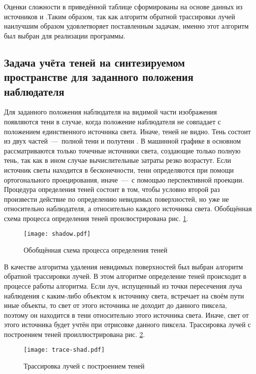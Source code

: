 Оценки сложности в приведённой таблице сформированы на основе данных из источников \cite{item12} и \cite{item13}.Таким образом, так как алгоритм обратной трассировки лучей наилучшим образом удовлетворяет поставленным задачам, именно этот алгоритм был выбран для реализации программы.

\subsection{Задача учёта теней на синтезируемом пространстве для заданного положения наблюдателя}
Для заданного положения наблюдателя на видимой части изображения появляются тени в случае, когда положение наблюдателя не совпадает с положением единственного источника света. Иначе, теней не видно. Тень состоит из двух частей~---~полной тени и полутени \cite{item12}. В машинной графике в основном рассматриваются только точечные источники света, создающие только полную тень, так как в ином случае вычислительные затраты резко возрастут. Если источник светы находится в бесконечности, тени определяются при помощи ортогонального проецирования, иначе~---~с помощью перспективной проекции. Процедура определения теней состоит в том, чтобы условно второй раз произвести действие по определению невидимых поверхностей, но уже не относительно наблюдателя, а относительно каждого источника света. Обобщённая схема процесса определения теней проилюстрирована рис. \ref{img:shadow}.

\begin{figure}[h!]
    \centering
    \texttt{[image: shadow.pdf]}
    \caption{Обобщённая схема процесса определения теней}
    \label{img:shadow}
\end{figure}

В качестве алгоритма удаления невидимых поверхностей был выбран алгоритм обратной трассировки лучей. В этом алгоритме определение теней происходит в процессе работы алгоритма. Если луч, испущенный из точки пересечения луча наблюдения с каким-либо объектом к источнику света, встречает на своём пути иные объекты, то свет от этого источника не доходит до данного пиксела, поэтому он находится в тени относительно этого источника света. Иначе, свет от этого источника будет учтён при отрисовке данного пиксела. Трассировка лучей с построением теней проиллюстрирована рис. \ref{img:trace-shad}.

\begin{figure}[h!]
    \centering
    \texttt{[image: trace-shad.pdf]}
    \caption{Трассировка лучей с построением теней}
    \label{img:trace-shad}
\end{figure}

